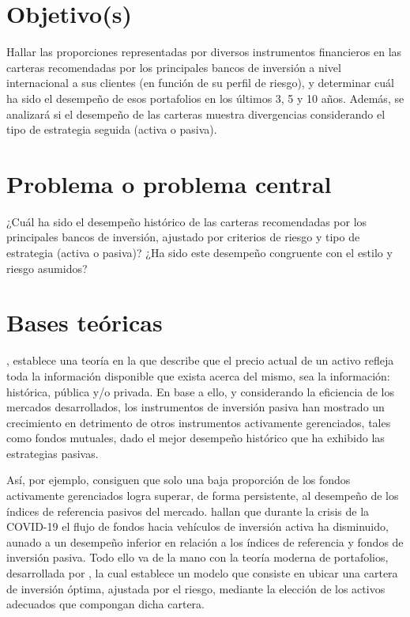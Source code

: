 \documentclass[a4paper,fleqn]{cas-sc}
\begin{document}
\section{Objetivo(s)}
Hallar las proporciones representadas por diversos instrumentos financieros en las
carteras recomendadas por los principales bancos de inversión a nivel internacional a sus clientes (en
función de su perfil de riesgo), y determinar cuál ha sido el desempeño de esos portafolios en los
últimos 3, 5 y 10 años. Además, se analizará si el desempeño de las carteras muestra divergencias
considerando el tipo de estrategia seguida (activa o pasiva).

\section{Problema o problema central} 
¿Cuál ha sido el desempeño histórico de las carteras recomendadas
por los principales bancos de inversión, ajustado por criterios de riesgo y tipo de estrategia (activa o
pasiva)? ¿Ha sido este desempeño congruente con el estilo y riesgo asumidos?

\section{Bases teóricas} 
\cite{fama1970}, establece una teoría en la que describe que el precio actual de
un activo refleja toda la información disponible que exista acerca del mismo, sea la información:
histórica, pública y/o privada. En base a ello, y considerando la eficiencia de los mercados
desarrollados, los instrumentos de inversión pasiva han mostrado un crecimiento en detrimento de
otros instrumentos activamente gerenciados, tales como fondos mutuales, dado el mejor desempeño
histórico que ha exhibido las estrategias pasivas.

Así, por ejemplo, \cite{Chan1999} consiguen que solo una baja proporción de los
fondos activamente gerenciados logra superar, de forma persistente, al desempeño de los índices de
referencia pasivos del mercado. \cite{Pastor2020} hallan que durante la crisis de la COVID-19 el
flujo de fondos hacia vehículos de inversión activa ha disminuido, aunado a un desempeño inferior en
relación a los índices de referencia y fondos de inversión pasiva. Todo ello va de la mano con la teoría
moderna de portafolios, desarrollada por \cite{Markowitz1952}, la cual establece un modelo que consiste
en ubicar una cartera de inversión óptima, ajustada por el riesgo, mediante la elección de los activos
adecuados que compongan dicha cartera.
\end{document}
